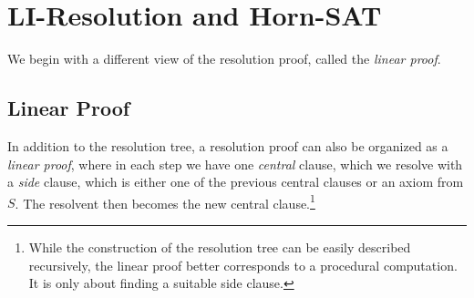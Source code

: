\section{LI-Resolution and Horn-SAT}

We begin with a different view of the resolution proof, called the \emph{linear proof}.

\subsection{Linear Proof}

In addition to the resolution tree, a resolution proof can also be organized as a \emph{linear proof}, where in each step we have one \emph{central} clause, which we resolve with a \emph{side} clause, which is either one of the previous central clauses or an axiom from $S$. The resolvent then becomes the new central clause.\footnote{While the construction of the resolution tree can be easily described recursively, the linear proof better corresponds to a procedural computation. It is only about finding a suitable side clause.}

